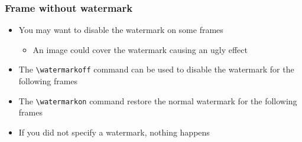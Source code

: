 \watermarkoff
\begin{frame}[t,fragile]
\frametitle{Frame without watermark}

\begin{itemize}
\item You may want to disable the watermark on some frames
  \begin{itemize}
  \item An image could cover the watermark causing an ugly effect
  \end{itemize}
\item The \verb!\watermarkoff! command can be used to disable the watermark for the following frames
\item The \verb!\watermarkon! command restore the normal watermark for the following frames
\item If you did not specify a watermark, nothing happens
\end{itemize}

\end{frame}
\watermarkon
